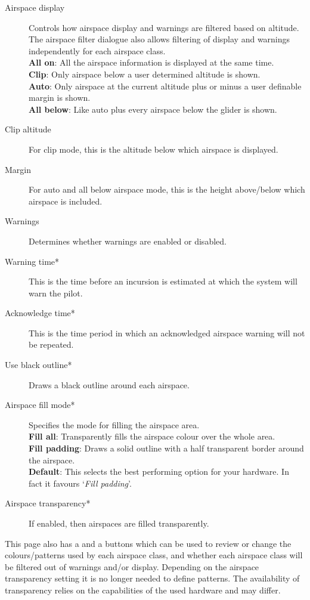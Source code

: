 \begin{description}
\item[Airspace display]  Controls how airspace display and warnings are filtered 
  based on altitude.  The airspace filter dialogue also allows filtering
  of display and warnings independently for each airspace class. \\
  {\bf All on}: All the airspace information is displayed at the same time. \\
  {\bf Clip}: Only airspace below a user determined altitude is shown. \\
  {\bf Auto}: Only airspace at the current altitude plus or minus a user 
    definable margin is shown.
 \\
  {\bf All below}:  Like auto plus every airspace below the glider is shown.
\item[Clip altitude] For clip mode, this is the altitude below which airspace 
  is displayed.
\item[Margin]  For auto and all below airspace mode, this is the height 
  above/below which airspace is included.
\item[Warnings]  Determines whether warnings are enabled or disabled.
\item[Warning time*]  This is the time before an incursion is estimated at
  which the system will warn the pilot.
\item[Acknowledge time*]  This is the time period in which an acknowledged airspace 
  warning will not be repeated.
\item[Use black outline*]  Draws a black outline around each airspace.
\item[Airspace fill mode*]  Specifies the mode for filling the airspace area. \\
  {\bf Fill all}:  Transparently fills the airspace colour over the whole area. \\
  {\bf Fill padding}: Draws a solid outline with a half transparent border 
    around the airspace. \\
  {\bf Default}:  This selects the best performing option for your hardware. In fact 
    it favours `{\it Fill padding}'.
\item[Airspace transparency*]  If enabled, then airspaces are filled transparently.
\end{description}

This page also has a  and a  buttons which
can be used to review or change the colours/patterns used by each
airspace class, and whether each airspace class will be filtered out
of warnings and/or display. Depending on the airspace transparency setting it is 
no longer needed to define patterns. The availability of transparency relies 
on the capabilities of the used hardware and may differ. 

